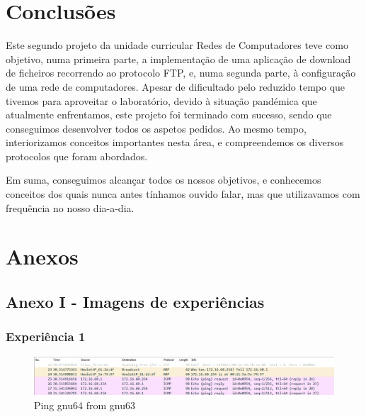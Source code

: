 \documentclass[article, a4paper, 11pt, oneside]{memoir}
\begin{document}
\chapter[Conclusões][Conclusões]{Conclusões} \label{\thechapter}

Este segundo projeto da unidade curricular Redes de Computadores teve como objetivo, numa primeira parte, a implementação de uma aplicação de download de ficheiros recorrendo ao protocolo FTP,
e, numa segunda parte, à configuração de uma rede de computadores. Apesar de dificultado pelo reduzido tempo que tivemos para aproveitar o laboratório, devido à situação pandémica que atualmente enfrentamos,
este projeto foi terminado com sucesso, sendo que conseguimos desenvolver todos os aspetos pedidos.
Ao mesmo tempo, interiorizamos conceitos importantes nesta área, e compreendemos os diversos protocolos que foram abordados.

Em suma, conseguimos alcançar todos os nossos objetivos, e conhecemos conceitos dos quais nunca antes tínhamos ouvido falar, mas que utilizavamos com frequência no nosso dia-a-dia.

\newpage
\chapter[Anexos][Anexos]{Anexos} \label{\thechapter}

\section{Anexo I - Imagens de experiências}
\subsection{Experiência 1}

\begin{figure}[h]
	\centering
\includegraphics[scale=0.55]{exp1-gnu63.png}
\caption{Ping gnu64 from gnu63}
\end{figure}
\end{document}

